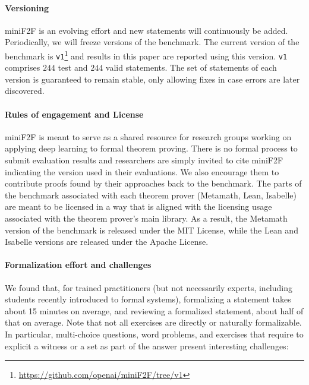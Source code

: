 \paragraph*{Versioning}
\textsf{miniF2F} is an evolving effort and new statements will continuously be added. Periodically, we will freeze versions of the benchmark. The current version of the benchmark is \texttt{v1}\footnote{
\url{https://github.com/openai/miniF2F/tree/v1}

} and results in this paper are reported using this version. \texttt{v1} comprises $244$ test and $244$ valid statements. The set of statements of each version is guaranteed to remain stable, only allowing fixes in case errors are later discovered.

\paragraph*{Rules of engagement and License} \textsf{miniF2F} is meant to serve as a shared resource for research groups working on applying deep learning to formal theorem proving. There is no formal process to submit evaluation results and researchers are simply invited to cite \textsf{miniF2F} indicating the version used in their evaluations. We also encourage them to contribute proofs found by their approaches back to the benchmark. The parts of the benchmark associated with each theorem prover (Metamath, Lean, Isabelle) are meant to be licensed in a way that is aligned with the licensing usage associated with the theorem prover's main library. As a result, the Metamath version of the benchmark is released under the MIT License, while the Lean and Isabelle versions are released under the Apache License.

\paragraph*{Formalization effort and challenges} We found that, for trained practitioners (but not necessarily experts, including students recently introduced to formal systems), formalizing a statement takes about 15 minutes on average, and reviewing a formalized statement, about half of that on average. Note that not all exercises are directly or naturally formalizable. In particular, multi-choice questions, word problems, and exercises that require to explicit a witness or a set as part of the answer present interesting challenges:

